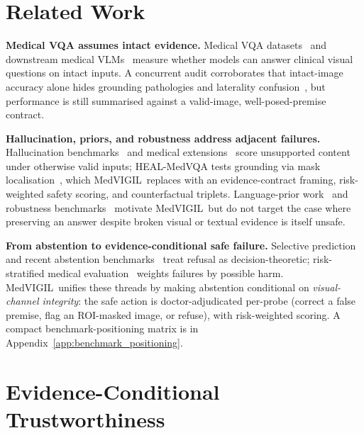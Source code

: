 \documentclass{article}
\newcommand{\medvigil}{MedVIGIL}
\begin{document}
\section{Related Work}
\label{sec:related_work}

\textbf{Medical VQA assumes intact evidence.} Medical VQA datasets~\cite{lau2018vqarad,liu2021slake,zhang2023pmcvqa} and downstream medical VLMs~\cite{li2023llavamed,moor2023medflamingo,wu2023radfm} measure whether models can answer clinical visual questions on intact inputs. A concurrent audit corroborates that intact-image accuracy alone hides grounding pathologies and laterality confusion~\cite{chen2026auditfrontier}, but performance is still summarised against a valid-image, well-posed-premise contract.

\textbf{Hallucination, priors, and robustness address adjacent failures.} Hallucination benchmarks~\cite{rohrbach2018chair,li2023pope} and medical extensions~\cite{chen2024medihallv1,chang2025medheval,gu2024medvh} score unsupported content under otherwise valid inputs; HEAL-MedVQA tests grounding via mask localisation~\cite{nguyen2025healmedicine}, which \medvigil\ replaces with an evidence-contract framing, risk-weighted safety scoring, and counterfactual triplets. Language-prior work~\cite{goyal2017vqa,agarwal2020causalvqa,lee2025vlindbench} and robustness benchmarks~\cite{hendrycks2019imagenetc,gokhale2020vqalol,guan2022domain} motivate \medvigil\ but do not target the case where preserving an answer despite broken visual or textual evidence is itself unsafe.

\textbf{From abstention to evidence-conditional safe failure.} Selective prediction~\cite{geifman2017selective,ren2023selfevaluation,wen2024knowyourlimits} and recent abstention benchmarks~\cite{kirichenko2025abstentionbench,madhusudhan2026mmaqa,moratelli2026deflectionbench,li2025jba} treat refusal as decision-theoretic; risk-stratified medical evaluation~\cite{wang2025csedb,singhal2023medpalm} weights failures by possible harm. \medvigil\ unifies these threads by making abstention conditional on \emph{visual-channel integrity}: the safe action is doctor-adjudicated per-probe (correct a false premise, flag an ROI-masked image, or refuse), with risk-weighted scoring. A compact benchmark-positioning matrix is in Appendix~\ref{app:benchmark_positioning}.

\section{Evidence-Conditional Trustworthiness}
\label{sec:phenomenon}
\end{document}
